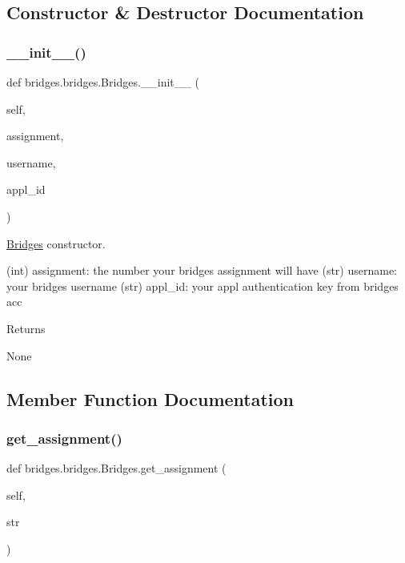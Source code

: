 \subsection{Constructor \& Destructor Documentation}
\mbox{\label{classbridges_1_1bridges_1_1_bridges_af174072883f6f269a9fe7cc02e12c276}} 
\subsubsection{\texorpdfstring{\+\_\+\+\_\+init\+\_\+\+\_\+()}{\_\_init\_\_()}}
{\footnotesize\ttfamily def bridges.\+bridges.\+Bridges.\+\_\+\+\_\+init\+\_\+\+\_\+ (\begin{DoxyParamCaption}\item[{}]{self,  }\item[{}]{assignment,  }\item[{}]{username,  }\item[{}]{appl\+\_\+id }\end{DoxyParamCaption})}



\hyperlink{classbridges_1_1bridges_1_1_bridges}{Bridges} constructor. 

(int) assignment\+: the number your bridges assignment will have (str) username\+: your bridges username (str) appl\+\_\+id\+: your appl authentication key from bridges acc \begin{DoxyReturn}{Returns}


None 
\end{DoxyReturn}


\subsection{Member Function Documentation}
\mbox{\label{classbridges_1_1bridges_1_1_bridges_a1e7bd56f6a3beb03c91fc989cf3f7eb8}} 
\subsubsection{\texorpdfstring{get\+\_\+assignment()}{get\_assignment()}}
{\footnotesize\ttfamily def bridges.\+bridges.\+Bridges.\+get\+\_\+assignment (\begin{DoxyParamCaption}\item[{}]{self,  }\item[{}]{str }\end{DoxyParamCaption})}



